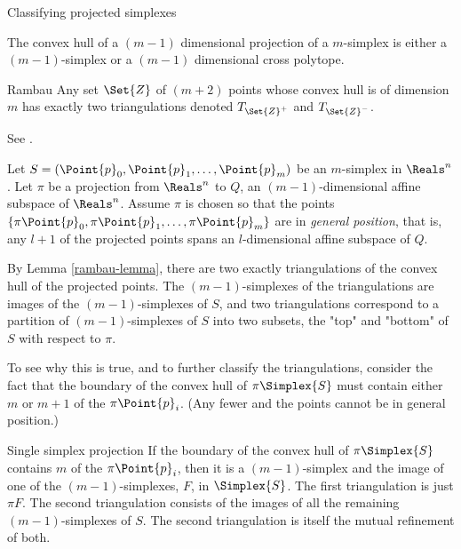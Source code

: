 \begin{plSection}{Classifying projected simplexes}
\label{sec:classifying}


The convex hull of a $(m-1)$ dimensional projection of a $m$-simplex
is either a $(m-1)$-simplex or a $(m-1)$ dimensional cross polytope.

\begin{plLemma}{Rambau}{}
\label{rambau-lemma}
Any set $\Set{Z}$ of $(m+2)$ points whose convex hull is of dimension $m$
has exactly two triangulations denoted $T_{\Set{Z}^+}$ and $T_{\Set{Z}^-}$.
\end{plLemma}

See .

Let $S=(\Point{p}_0, \Point{p}_1, \ldots , \Point{p}_m)$ be an $m$-simplex in $\Reals^{n}$.
Let $\pi$ be a projection from $\Reals^{n}$ to $Q$, an $(m-1)$-dimensional
affine subspace of $\Reals^{n}$.
Assume $\pi$ is chosen so that the points
$\left\{\pi \Point{p}_0, \pi \Point{p}_1, \ldots , \pi \Point{p}_m\right\}$ are in {\it general position},
that is, any $l+1$ of the projected points spans an $l$-dimensional
affine subspace of $Q$.

By Lemma \ref{rambau-lemma},
there are two exactly triangulations of the convex hull of the projected points.
The $(m-1)$-simplexes of the triangulations are images of the $(m-1)$-simplexes of $S$,
and two triangulations correspond to a partition of $(m-1)$-simplexes of $S$
into two subsets, the "top" and "bottom" of $S$ with respect to $\pi$.

To see why this is true, and to further classify the triangulations,
consider the fact that the boundary of the convex hull of $\pi \Simplex{S}$
must contain either $m$ or $m+1$ of the $\pi \Point{p}_i$.
(Any fewer and the points cannot be in general position.)

\begin{plTheorem}{Single simplex projection}{}
\label{one-simplex-case}
If the boundary of the convex hull of $\pi \Simplex{S}$
contains $m$ of the $\pi \Point{p}_i$,
then it is a $(m-1)$-simplex
and the image of one of the $(m-1)$-simplexes, $F$, in $\Simplex{S}$.
The first triangulation is just $\pi F$.
The second triangulation consists of the images of
all the remaining $(m-1)$-simplexes of $S$.
The second triangulation is itself the mutual refinement of both.
\end{plTheorem}


\end{plSection}
